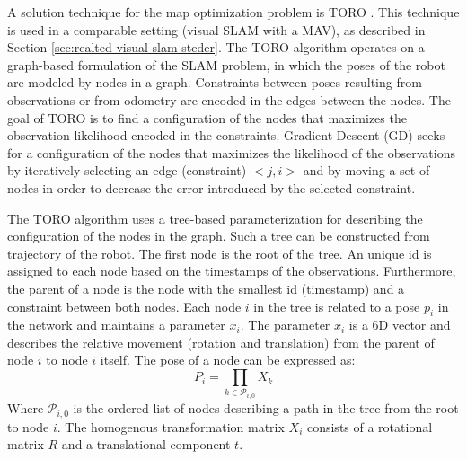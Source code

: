 A solution technique for the map optimization problem is TORO \cite{grisetti2007efficient}. This technique is used in a comparable setting (visual SLAM with a MAV), as described in Section \ref{sec:realted-visual-slam-steder}.
The TORO algorithm operates on a graph-based formulation of the SLAM problem, in which the poses of the robot are modeled by nodes in a graph.
Constraints between poses resulting from observations or from odometry are encoded in the edges between the nodes.
The goal of TORO is to find a configuration of the nodes that maximizes the observation likelihood encoded in the constraints.
Gradient Descent (GD) \cite{olson2006fast} seeks for a configuration of the nodes that maximizes the likelihood of the observations by iteratively selecting an edge (constraint) $< j, i >$ and by moving a set of nodes
in order to decrease the error introduced by the selected constraint.

\begin{comment}
The nodes are updated according to the following equation: 
\begin{equation}
x^{t + 1} = x^t + \Delta x
\end{equation}
where $x$ is the set of variables describing the locations of the poses in the network, and the term $\Delta x$ is used to move a node in the direction that decreases the error.
The direction of $\Delta x$ is computed from the residual (opposite of the error vector) scaled by the information encoded in the contraint.
In practice, GD decomposes the overall problem into many smaller problems by optimizing the constraints individually.
\end{comment}

The TORO algorithm uses a tree-based parameterization for describing the configuration of the nodes in the graph.
Such a tree can be constructed from trajectory of the robot.
The first node is the root of the tree.
An unique id is assigned to each node based on the timestamps of the observations.
Furthermore, the parent of a node is the node with the smallest id (timestamp) and a constraint between both nodes.
Each node $i$ in the tree is related to a pose $p_i$ in the network and maintains a parameter $x_i$.
The parameter $x_i$ is a 6D vector and describes the relative movement (rotation and translation) from the parent of node $i$ to  node $i$ itself.
The pose of a node can be expressed as:
\begin{equation}
P_i = \prod_{k \in \mathcal{P}_{i,0}} X_k
\end{equation}
Where $\mathcal{P}_{i,0}$ is the ordered list of nodes describing a path in the tree from the root to node $i$.
The homogenous transformation matrix $X_i$ consists of a rotational matrix $R$ and a translational component $t$.

